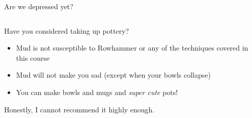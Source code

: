 \documentclass[9pt,aspectratio=169]{beamer}
\begin{document}
\begin{frame}[label={sec:org07a23c0}]{Are we depressed yet?}
\begin{columns}
\begin{column}[t]{0.6\columnwidth}
Have you considered taking up pottery?
\begin{itemize}
\item Mud is not susceptible to Rowhammer or any of the techniques covered in this course
\item Mud will not make you sad (except when your bowls collapse)
\item You can make bowls and mugs and \emph{super cute} pots!
\end{itemize}

\vfill
\begin{block}{Honestly, I cannot recommend it highly enough.}
\end{block}
\end{column}




\end{columns}
\end{frame}
\end{document}
